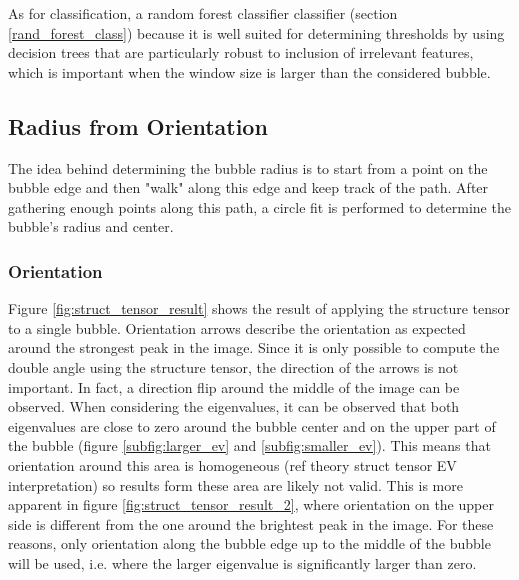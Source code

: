 		As for classification, a random forest classifier classifier (section \ref{rand_forest_class}) because it is well suited for determining thresholds by using decision trees that are particularly robust to inclusion of irrelevant features, which is important when the window size is larger than the considered bubble.
		
		
		
	
	\subsection{Radius from Orientation}\label{radius_from_orientation}
		The idea behind determining the bubble radius is to start from a point on the bubble edge and then "walk" along this edge and keep track of the path. After gathering enough points along this path, a circle fit is performed to determine the bubble's radius and center. 
		
		\subsubsection{Orientation}
		
		Figure \ref{fig:struct_tensor_result} shows the result of applying the structure tensor to a single bubble. Orientation arrows describe the orientation as expected around the strongest peak in the image. Since it is only possible to compute the double angle using the structure tensor, the direction of the arrows is not important. In fact, a direction flip around the middle of the image can be observed. When considering the eigenvalues, it can be observed that both eigenvalues are close to zero around the bubble center and on the upper part of the bubble (figure \ref{subfig:larger_ev} and \ref{subfig:smaller_ev}). This means that orientation around this area is homogeneous (ref theory struct tensor EV interpretation) so results form these area are likely not valid. This is more apparent in figure \ref{fig:struct_tensor_result_2}, where orientation on the upper side is different from the one around the brightest peak in the image. For these reasons, only orientation along the bubble edge up to the middle of the bubble will be used, i.e. where the larger eigenvalue is significantly larger than zero.
		
